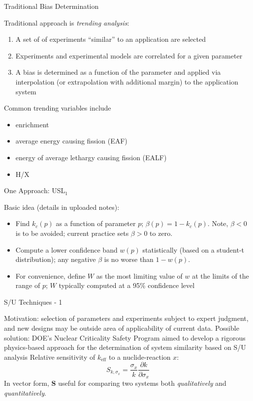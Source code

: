 \documentclass[10pt]{beamer}
\newcommand{\keff}{$k_{\text{eff}}$ }
\begin{document}
\begin{frame}{Traditional Bias Determination}

Traditional approach is {\it trending analysis}: 
\begin{enumerate}
 \item A set of of experiments ``similar'' to an application are selected
 \item Experiments and experimental models are correlated for a given
       parameter 
 \item A bias is determined as a function of the parameter and applied
       via interpolation (or extrapolation with additional margin) to 
       the application system 
\end{enumerate}
Common trending variables include
\begin{itemize}
 \item enrichment
 \item average energy causing fission (EAF)
 \item energy of average lethargy causing fission (EALF)
 \item H/X 
\end{itemize}

\end{frame}

\begin{frame}{One Approach: USL$_1$}

Basic idea (details in uploaded notes):
\begin{itemize}
 \item Find $k_c(p)$ as a function of parameter $p$; $\beta(p) = 1 - k_c(p)$. 
       Note, $\beta < 0$ is to be avoided; current practice sets 
       $\beta > 0$ to zero.
 \item Compute a lower confidence band $w(p)$ statistically (based on a 
       student-t distribution); any negative
       $\beta$ is no worse than $1 - w(p)$.
 \item For convenience, define $W$ as the most limiting value of $w$ at the
       limits of the range of $p$; $W$ typically computed at a 95\% 
       confidence level
\end{itemize}

\end{frame}

\begin{frame}{S/U Techniques - 1}

Motivation: selection of parameters and experiments subject to expert
judgment, and new designs may be outside area of applicability of 
current data.
\vfill
Possible solution: DOE's Nuclear Criticality Safety Program aimed to
develop \textcolor{mitred}{a rigorous physics-based approach for the 
determination of system similarity} based on S/U analysis
\pause
\vfill
Relative sensitivity of \keff to a nuclide-reaction $x$:
\begin{equation}
 S_{k,\sigma_x} = \frac{\sigma_x}{k}\frac{\partial k}{\partial \sigma_x} 
\end{equation}
In vector form, $\mathbf{S}$ useful for comparing two systems
both {\it qualitatively} and {\it quantitatively}.
\end{frame}
\end{document}
